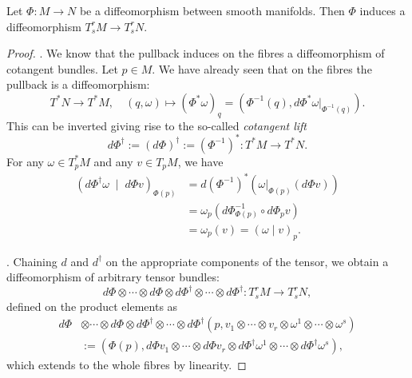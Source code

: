 \begin{proposition}
  Let $\Phi:M\to N$ be a diffeomorphism between smooth manifolds.
  Then $\Phi$ induces a diffeomorphism $T_s^rM \to T_s^r N$.
\end{proposition}
\begin{proof}
.
We know that the pullback induces on the fibres a diffeomorphism of cotangent bundles. Let $p\in M$.
We have already seen that on the fibres the pullback is a diffeomorphism:
\begin{equation}
  T^*N \to T^* M, \quad
  (q,\omega) \mapsto (\Phi^*\omega)_q = \left(\Phi^{-1}(q), d\Phi^*\omega|_{\Phi^{-1}(q)}\right).
\end{equation}
This can be inverted giving rise to the so-called \emph{cotangent lift}
\begin{equation}
  d\Phi^\dagger :=(d\Phi)^\dagger := (\Phi^{-1})^*: T^*M \to T^*N.
\end{equation}
For any $\omega\in T_p^* M$ and any $v\in T_pM$, we have
\begin{align}
  (d\Phi^\dagger \omega \;\mid\; d\Phi v)_{\Phi(p)} &=  d(\Phi^{-1})^*(\omega|_{\Phi(p)} (d\Phi v) )\\
  &= \omega_p(d\Phi^{-1}_{\Phi(p)} \circ d\Phi_p v ) \\
  &= \omega_p(v) = (\omega \mid v)_p.
\end{align}

.
Chaining $d$ and $d^\dagger$ on the appropriate components of the tensor, we obtain a diffeomorphism of arbitrary tensor bundles:
\begin{equation}
  d\Phi \otimes\cdots\otimes d\Phi \otimes d\Phi^\dagger \otimes\cdots\otimes d\Phi^\dagger  : T_s^rM \to T_s^r N,
\end{equation}
defined on the product elements as
\begin{align}
  d\Phi &\otimes\cdots\otimes d\Phi \otimes d\Phi^\dagger \otimes\cdots\otimes d\Phi^\dagger  (p, v_1 \otimes \cdots\otimes v_r \otimes \omega^1\otimes\cdots\otimes\omega^s) \\
  &:= (\Phi(p), d\Phi v_1 \otimes \cdots\otimes d\Phi v_r \otimes d\Phi^\dagger \omega^1\otimes\cdots\otimes d\Phi^\dagger \omega^s),
\end{align}
which extends to the whole fibres by linearity.
\end{proof}

